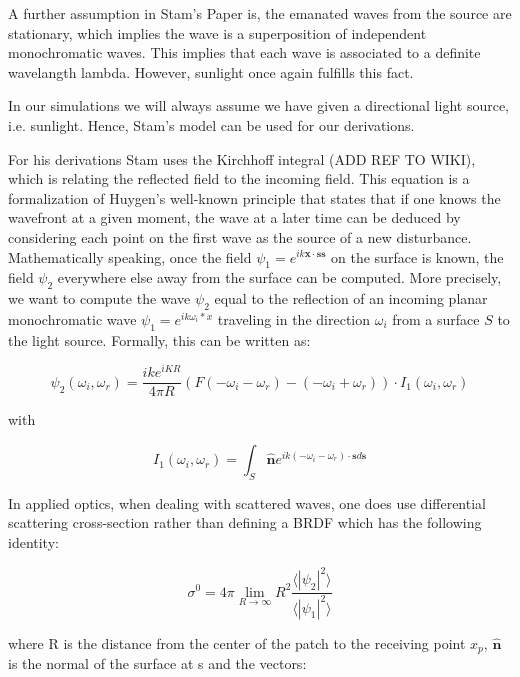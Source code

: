 A further assumption in Stam's Paper is, the emanated waves from the source are stationary, which implies the wave is a superposition of independent monochromatic waves. This implies that each wave is associated to a definite wavelangth lambda. However, sunlight once again fulfills this fact.

In our simulations we will always assume we have given a directional light source, i.e. sunlight. Hence, Stam's model can be used for our derivations.

For his derivations Stam uses the Kirchhoff integral (ADD REF TO WIKI), which is relating the reflected field to the incoming field. This equation is a formalization of Huygen’s well-known principle that states that if one knows the wavefront at a given moment, the wave at a later time can be deduced by considering each point on the first wave as the source of a new disturbance. Mathematically speaking, once the field  $\psi_1 =  e^{ik\mathbf{x} \cdot \mathbf{s}\mathbf{s}}$ on the surface is known, the field $\psi_2$ everywhere else away from the surface can be computed.
More precisely, we want to compute the wave $\psi_2$ equal to the reflection of an incoming planar monochromatic wave $\psi_1 = e^{ik \omega_i * x}$  traveling in the direction $\omega_i$ from a surface $S$ to the light source. Formally, this can be written as:

\begin{equation}
\psi_{2}(\omega_i, \omega_r) = \frac{i k e^{i K R}}{4 \pi R} (F(-\omega_i-\omega_r)-(-\omega_i+\omega_r)) \cdot I_{1}(\omega_i, \omega_r) 
\label{eq:kirchhoff}
\end{equation}

with

\begin{equation}
I_{1}(\omega_i, \omega_r) = \int_{S} \hat{\mathbf{n}} e^{ik(-\omega_i-\omega_{r}) \cdot \mathbf{s} d\mathbf{s}}
\label{eq:IBase}
\end{equation}

In applied optics, when dealing with scattered waves, one does use differential scattering cross-section rather than defining a BRDF which has the following identity: 

\begin{equation}
    \sigma^0 = 4 \pi \lim_{R \to \infty} R^2 \frac{\langle \left|\psi_2\right|^2\rangle}{\langle \left|\psi_1\right|^2\rangle}
\end{equation}

where R is the distance from the center of the patch to the receiving point $x_p$, $\hat{\mathbf{n}}$ is the normal of the surface at s and the vectors:

